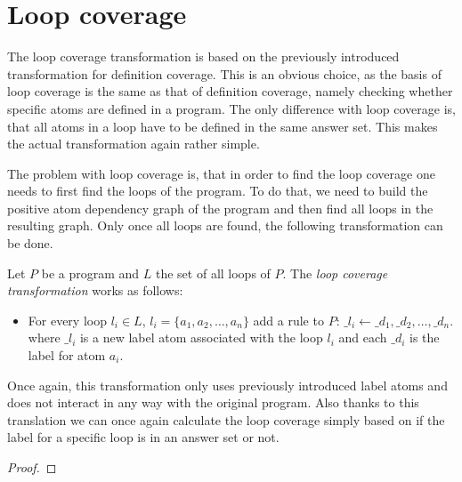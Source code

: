 \section{Loop coverage}
\label{sec:Computing coverage metrics for propositional programs/Loop coverage}
The loop coverage transformation is based on the previously introduced transformation for definition coverage. This is an obvious choice, as the basis of loop coverage is the same as that of definition coverage, namely checking whether specific atoms are defined in a program. The only difference with loop coverage is, that all atoms in a loop have to be defined in the same answer set. This makes the actual transformation again rather simple. 

The problem with loop coverage is, that in order to find the loop coverage one needs to first find the loops of the program. To do that, we need to build the positive atom dependency graph of the program and then find all loops in the resulting graph. Only once all loops are found, the following transformation can be done.

\begin{definition}
\label{def:loop transformation}
     Let $P$ be a program and $L$ the set of all loops of $P$. The \emph{loop coverage transformation} works as follows:
    \begin{itemize}
        \item For every loop \(l_i \in L\), \(l_i = \{a_1, a_2, \ldots, a_n\}\) add a rule to $P$: \(\_l_i \leftarrow \_d_1, \_d_2, \ldots, \_d_n.\) where $\_l_i$ is a new label atom associated with the loop $l_i$ and each $\_d_i$ is the label for atom $a_i$.
    \end{itemize}
\end{definition}

Once again, this transformation only uses previously introduced label atoms and does not interact in any way with the original program. Also thanks to this translation we can once again calculate the loop coverage simply based on if the label for a specific loop is in an answer set or not.

\begin{proof}

\end{proof}

